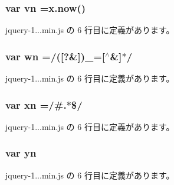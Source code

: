 \subsubsection[{vn}]{\setlength{\rightskip}{0pt plus 5cm}var vn =x.\+now()}\label{jquery-1_810_82_8min_8js_a4d3ea42bab8c1a36105c29b5a098a050}


 jquery-\/1...\+min.\+js の 6 行目に定義があります。

\hypertarget{jquery-1_810_82_8min_8js_aaa87ec69cc4d144180280e906cac73f1}{}
\subsubsection[{wn}]{\setlength{\rightskip}{0pt plus 5cm}var wn =/(\mbox{[}?\&\mbox{]})\+\_\+=\mbox{[}$^\wedge$\&\mbox{]}$\ast$/}\label{jquery-1_810_82_8min_8js_aaa87ec69cc4d144180280e906cac73f1}


 jquery-\/1...\+min.\+js の 6 行目に定義があります。

\hypertarget{jquery-1_810_82_8min_8js_a5d600963c6441f15f548bc0b847b6a04}{}
\subsubsection[{xn}]{\setlength{\rightskip}{0pt plus 5cm}var xn =/\#.$\ast$\$/}\label{jquery-1_810_82_8min_8js_a5d600963c6441f15f548bc0b847b6a04}


 jquery-\/1...\+min.\+js の 6 行目に定義があります。

\hypertarget{jquery-1_810_82_8min_8js_a390d7ca752a48e31e8ffb5209c0a4cd6}{}
\subsubsection[{yn}]{\setlength{\rightskip}{0pt plus 5cm}var yn}\label{jquery-1_810_82_8min_8js_a390d7ca752a48e31e8ffb5209c0a4cd6}


 jquery-\/1...\+min.\+js の 6 行目に定義があります。

